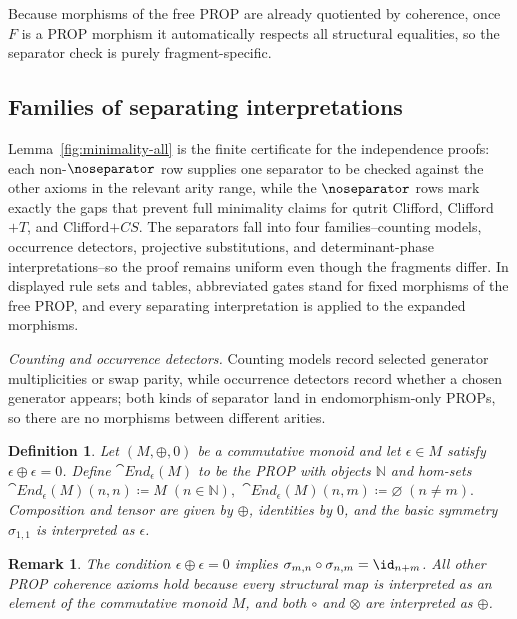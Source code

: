 \documentclass[10pt,a4paper]{article}
\newtheorem{definition}[theorem]{Definition}
\newtheorem{remark}[theorem]{Remark}
\def\Cref#1{Lemma~\ref{#1}}%
\begin{document}
Because morphisms of the free PROP are already quotiented by coherence, once \(F\) is a PROP morphism
it automatically respects all structural equalities, so the separator check is purely
fragment-specific.

\subsection{Families of separating interpretations}

\Cref{fig:minimality-all} is the finite certificate for the independence proofs: each
non-\(\noseparator\) row supplies one separator to be checked against the other axioms in the
relevant arity range, while the \(\noseparator\) rows mark exactly the gaps that prevent full
minimality claims for qutrit Clifford, Clifford\(+T\), and Clifford\(+CS\).  The separators fall into
four families--counting models, occurrence detectors, projective substitutions, and
determinant-phase interpretations--so the proof remains uniform even though the fragments differ.
In displayed rule sets and tables, abbreviated gates stand for fixed morphisms of the free PROP, and
every separating interpretation is applied to the expanded morphisms.

\emph{Counting and occurrence detectors.}
Counting models record selected generator multiplicities or swap parity, while occurrence detectors
record whether a chosen generator appears; both kinds of separator land in endomorphism-only PROPs,
so there are no morphisms between different arities.

\begin{definition}\label{def:endM}
Let \((M,\oplus,0)\) be a commutative monoid and let \(\epsilon\in M\) satisfy
\(\epsilon\oplus\epsilon=0\).  Define \(\cat{End}_{\epsilon}(M)\) to be the PROP with objects
\(\mathbb{N}\) and hom-sets
\(
  \cat{End}_{\epsilon}(M)(n,n)\coloneqq M \; (n\in\mathbb{N}),
\)
\(
  \cat{End}_{\epsilon}(M)(n,m)\coloneqq \varnothing \; (n\neq m).
\)
Composition and tensor are given by \(\oplus\), identities by \(0\), and the basic symmetry
\(\sigma_{1,1}\) is interpreted as \(\epsilon\).
\end{definition}

\begin{remark}
The condition \(\epsilon\oplus\epsilon=0\) implies \(\sigma_{m,n}\circ\sigma_{n,m}=\id_{n+m}\).
All other PROP coherence axioms hold because every structural map is interpreted as an element of
the commutative monoid \(M\), and both \(\circ\) and \(\otimes\) are interpreted as \(\oplus\).
\end{remark}
\end{document}
